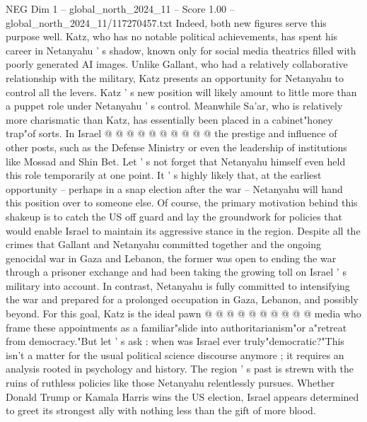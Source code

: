 \begin{textsample}{NEG Dim 1 – global\_north\_2024\_11 – Score 1.00 – global\_north\_2024\_11/117270457.txt}
Indeed, both new figures serve this purpose well.
Katz, who has no notable political achievements, has spent his career in Netanyahu ' s shadow, known only for social media theatrics filled with poorly generated AI images.
Unlike Gallant, who had a relatively collaborative relationship with the military, Katz presents an opportunity for Netanyahu to control all the levers.
Katz ' s new position will likely amount to little more than a puppet role under Netanyahu ' s control.
Meanwhile Sa'ar, who is relatively more charismatic than Katz, has essentially been placed in a cabinet"honey trap"of sorts.
In Israel @ @ @ @ @ @ @ @ @ @ the prestige and influence of other posts, such as the Defense Ministry or even the leadership of institutions like Mossad and Shin Bet.
Let ' s not forget that Netanyahu himself even held this role temporarily at one point.
It ' s highly likely that, at the earliest opportunity -- perhaps in a snap election after the war -- Netanyahu will hand this position over to someone else.
Of course, the primary motivation behind this shakeup is to catch the US off guard and lay the groundwork for policies that would enable Israel to maintain its aggressive stance in the region.
Despite all the crimes that Gallant and Netanyahu committed together and the ongoing genocidal war in Gaza and Lebanon, the former was open to ending the war through a prisoner exchange and had been taking the growing toll on Israel ' s military into account.
In contrast, Netanyahu is fully committed to intensifying the war and prepared for a prolonged occupation in Gaza, Lebanon, and possibly beyond.
For this goal, Katz is the ideal pawn @ @ @ @ @ @ @ @ @ @ media who frame these appointments as a familiar"slide into authoritarianism"or a"retreat from democracy."But let ' s ask : when was Israel ever truly"democratic?"This isn't a matter for the usual political science discourse anymore ; it requires an analysis rooted in psychology and history.
The region ' s past is strewn with the ruins of ruthless policies like those Netanyahu relentlessly pursues.
Whether Donald Trump or Kamala Harris wins the US election, Israel appears determined to greet its strongest ally with nothing less than the gift of more blood.

\end{textsample}
